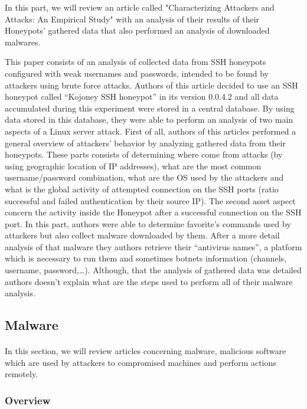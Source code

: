 In this part, we will review an article called "Characterizing Attackers and Attacks: An
Empirical Study" \cite{paperAnEmpirical} with an analysis of their results of their Honeypots’
gathered data that also performed an analysis of downloaded malwares.

This paper consists of an analysis of collected data from SSH honeypots configured with weak
usernames and passwords, intended to be found by attackers using brute force attacks.
Authors of this article decided to use an SSH honeypot called “Kojoney SSH honeypot” \cite{kojoney} 
in its
version 0.0.4.2 and all data accumulated during this experiment were stored in a central
database.
By using data stored in this database, they were able to perform an analysis of two main
aspects of a Linux server attack. First of all, authors of this articles performed a general
overview of attackers’ behavior by analyzing gathered data from their honeypots. These parts
consists of determining where come from attacks (by using geographic location of IP addresses),
what are the most common username/password combination, what are the OS used by the attackers
and what is the global activity of attempted connection on the SSH ports (ratio successful
and failed authentication by their source IP). The second asset aspect concern the activity
inside the Honeypot after a successful connection on the SSH port. In this part, authors were
able to determine favorite’s commands used by attackers but also collect malware downloaded
by them. After a more detail analysis of that malware they authors retrieve their
“antivirus names”, a platform which is necessary to run them and sometimes botnets information
(channels, username, password,…).
Although, that the analysis of gathered data was detailed authors doesn’t explain what are
the steps used to perform all of their malware analysis.

\subsection{Malware} %

\paragraph{}

In this section, we will review articles concerning malware, malicious software which are
used by attackers to compromised machines and perform actions remotely.

\subsubsection{Overview} %

